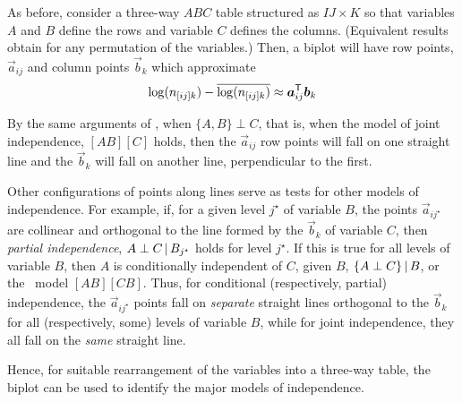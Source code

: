 As before, consider a three-way $ABC$ table structured as
\(I J \times  K\) so that variables $A$ and $B$ define the rows and
variable $C$ defines the columns.
(Equivalent results obtain for any permutation of the variables.)
Then, a biplot will have row points, $\vec{a}_{ij}$ and column points
$\vec{b}_{k}$ which approximate
\begin{equation*}
\log ( n_{[ij]k} ) - \overline{ \log ( n_{[ij]k} ) }
 \approx \bm{a}_{ij}^\mathsf{T} \bm{b}_{k}
\end{equation*}

By the same arguments of ,
when $\{A, B\} \perp C$, that is, when the model of joint independence,
$[A B][C]$ holds, then the $\vec{a}_{ij}$ row points will fall on
one straight line and the $\vec{b}_{k}$ will fall on another line,
perpendicular to the first.

Other configurations of points along lines serve as tests for other
models of independence.
For example, if, for a given level $j^{\star}$ of variable $B$, the
points $\vec{a}_{ij^{\star}}$ are collinear and orthogonal
to the line formed by the $\vec{b}_{k}$ of variable $C$,
then \emph{partial independence},
$A \perp C \, | \, B_{j^{\star}}$ holds for level $j^{\star}$.
If this is true for all levels of variable $B$,
then $A$ is conditionally independent of $C$, given $B$,
$\{ A \perp C \} \, | \, B$, or the \loglin\ model $[A B][C B]$.
Thus, for conditional (respectively, partial) independence, the
$\vec{a}_{ij^{\star}}$ points fall on \emph{separate} straight lines
orthogonal to the $\vec{b}_{k}$ for all (respectively, some) levels
of variable $B$, while for joint independence, they all fall on the
\emph{same} straight line.

Hence, for suitable rearrangement of the variables into a three-way
table, the biplot can be used to identify the major models of
independence.


